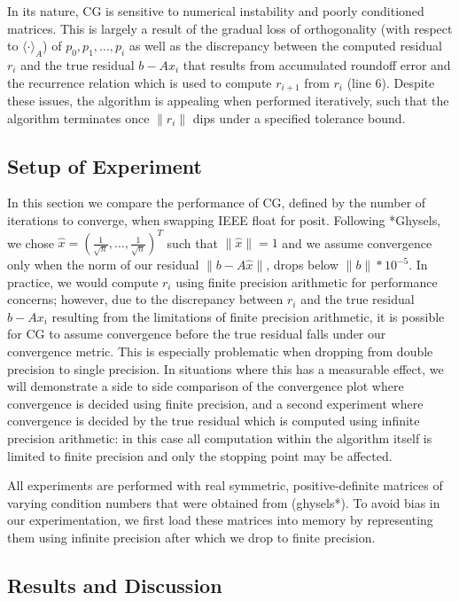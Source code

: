\documentclass[conference]{IEEEtran}
\begin{document}
In its nature, CG is sensitive to numerical instability and poorly conditioned matrices. This is largely a result of the gradual loss of orthogonality (with respect to $\langle \cdot \rangle_{A}$) of ${p_0, p_1, ... , p_i}$ as well as the discrepancy between the computed residual $r_{i}$ and the true residual $b-Ax_{i}$ that results from accumulated roundoff error and the recurrence relation which is used to compute $r_{i+1}$ from $r_{i}$ (line 6). Despite these issues, the algorithm is appealing when performed iteratively, such that the algorithm terminates once $\|r_{i}\|$ dips under a specified tolerance bound. 

\subsection{Setup of Experiment}

In this section we compare the performance of CG, defined by the number of iterations to converge, when swapping IEEE float for posit. Following *Ghysels, we chose $\hat{x} = (\frac{1}{\sqrt{n}},\ldots, \frac{1}{\sqrt{n}})^{T}$ such that $\|\hat{x}\| = 1$ and we assume convergence only when the norm of our residual $\|b-A\hat{x}\|$, drops below $\|b\|*10^{-5}$. In practice, we would compute $r_{i}$ using finite precision arithmetic for performance concerns; however, due to the discrepancy between $r_{i}$ and the true residual $\hat{b}-Ax_{i}$ resulting from the limitations of finite precision arithmetic, it is possible for CG to assume convergence before the true residual falls under our convergence metric. This is especially problematic when dropping from double precision to single precision. In situations where this has a measurable effect, we will demonstrate a side to side comparison of the convergence plot where convergence is decided using finite precision, and a second experiment where convergence is decided by the true residual which is computed using infinite precision arithmetic: in this case all computation within the algorithm itself is limited to finite precision and only the stopping point may be affected. 

All experiments are performed with real symmetric, positive-definite matrices of varying condition numbers that were obtained from (ghysels*). To avoid bias in our experimentation, we first load these matrices into memory by representing them using infinite precision after which we drop to finite precision. 

\subsection{Results and Discussion}
\end{document}
